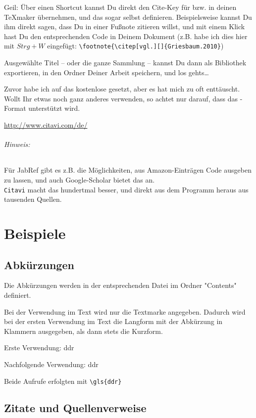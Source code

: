 Geil: Über einen Shortcut kannst Du direkt den Cite-Key für \latex bzw. \bibtex in deinen TeXmaker übernehmen, und das sogar selbst definieren. Beispielsweise kannst Du ihm direkt sagen, dass Du in einer Fußnote zitieren willst, und mit einem Klick hast Du den entsprechenden \latex Code in Deinem Dokument (z.B. habe ich dies hier mit $Strg+W$ eingefügt: \verb|\footnote{\citep[vgl.][]{Griesbaum.2010}|)

Ausgewählte Titel -- oder die ganze Sammlung -- kannst Du dann als \bibtex Bibliothek exportieren, in den Ordner Deiner Arbeit speichern, und los gehts\dots

Zuvor habe ich auf das kostenlose  gesetzt, aber es hat mich zu oft enttäuscht. Wollt Ihr etwas noch ganz anderes verwenden, so achtet nur darauf, dass das \bibtex-Format unterstützt wird.

\url{http://www.citavi.com/de/}

\subparagraph*{Hinweis:} Für JabRef gibt es z.B. die  Möglichkeiten, aus Amazon-Einträgen  \midx{\bibtex} Code ausgeben zu lassen, und auch Google-Scholar bietet das an. \\
\verb|Citavi| macht das hundertmal besser, und direkt aus dem Programm heraus aus tausenden Quellen.








\chapter{Beispiele}
\label{kap:beispiele}


\section{Abkürzungen}
Die Abkürzungen werden in der entsprechenden Datei im Ordner "Contents" definiert.

Bei der Verwendung im Text wird nur die Textmarke angegeben. Dadurch wird bei der ersten Verwendung im Text die Langform mit der Abkürzung in Klammern ausgegeben, als dann stets die Kurzform.

Erste Verwendung: \gls{ddr}

Nachfolgende Verwendung: \gls{ddr}

Beide Aufrufe erfolgten mit \verb|\gls{ddr}|




\section{Zitate und Quellenverweise}
